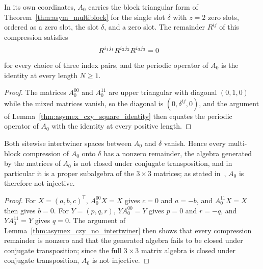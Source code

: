 \begin{lemma}
    \label{thm:asymex_czy_reduced_compression}
    \leanok
    In its own coordinates, $A_0$ carries the block triangular form of
    Theorem~\ref{thm:asym_multiblock} for the single slot $\delta$ with
    $z=2$ zero slots, ordered as a zero slot, the slot $\delta$, and a zero
    slot. The remainder $R^{ij}$ of this compression satisfies
    \begin{align}
        R^{i_1j_1}R^{i_2j_2}R^{i_3j_3} & =0
        \notag
    \end{align}
    for every choice of three index pairs, and the periodic operator of $A_0$
    is the identity at every length $N\geq1$.
\end{lemma}

\begin{proof}
    \leanok
    The matrices $A_0^{00}$ and $A_0^{11}$ are upper triangular with
    diagonal $(0,1,0)$ while the mixed matrices vanish, so the diagonal is
    $(0,\delta^{ij},0)$, and the argument of
    Lemma~\ref{thm:asymex_czy_square_identity} then equates the periodic
    operator of $A_0$ with the identity at every positive length.
\end{proof}

\begin{lemma}
    \label{thm:asymex_czy_reduced_nonsplit}
    \leanok
    Both sitewise intertwiner spaces between $A_0$ and $\delta$ vanish.
    Hence every multi-block compression of $A_0$ onto $\delta$ has a
    nonzero remainder, the algebra generated by the matrices of $A_0$ is
    not closed under conjugate transposition, and in particular it is a
    proper subalgebra of the $3\times3$ matrices; as stated
    in~\cite[Section~II]{Liu2025Bialgebraic}, $A_0$ is therefore not
    injective.
\end{lemma}

\begin{proof}
    \leanok
    For $X=(a,b,c)^{\mathsf T}$, $A_0^{00}X=X$ gives $c=0$ and $a=-b$,
    and $A_0^{11}X=X$ then gives $b=0$. For $Y=(p,q,r)$,
    $YA_0^{00}=Y$ gives $p=0$ and $r=-q$, and $YA_0^{11}=Y$ gives $q=0$.
    The argument of Lemma~\ref{thm:asymex_czy_no_intertwiner} then shows
    that every compression remainder is nonzero and that the generated
    algebra fails to be closed under conjugate transposition; since the
    full $3\times3$ matrix algebra is closed under conjugate
    transposition, $A_0$ is not injective.
\end{proof}


